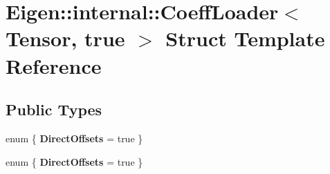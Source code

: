 \hypertarget{struct_eigen_1_1internal_1_1_coeff_loader_3_01_tensor_00_01true_01_4}{}\section{Eigen\+:\+:internal\+:\+:Coeff\+Loader$<$ Tensor, true $>$ Struct Template Reference}
\label{struct_eigen_1_1internal_1_1_coeff_loader_3_01_tensor_00_01true_01_4}
\subsection*{Public Types}
\begin{DoxyCompactItemize}
\item 
\mbox{\label{struct_eigen_1_1internal_1_1_coeff_loader_3_01_tensor_00_01true_01_4_aef006402fc86926c6be50b24afed64cf}} 
enum \{ {\bfseries Direct\+Offsets} = true
 \}
\item 
\mbox{\label{struct_eigen_1_1internal_1_1_coeff_loader_3_01_tensor_00_01true_01_4_adda070f0b7ce687c8fc1bbc7adc57fc6}} 
enum \{ {\bfseries Direct\+Offsets} = true
 \}
\end{DoxyCompactItemize}
